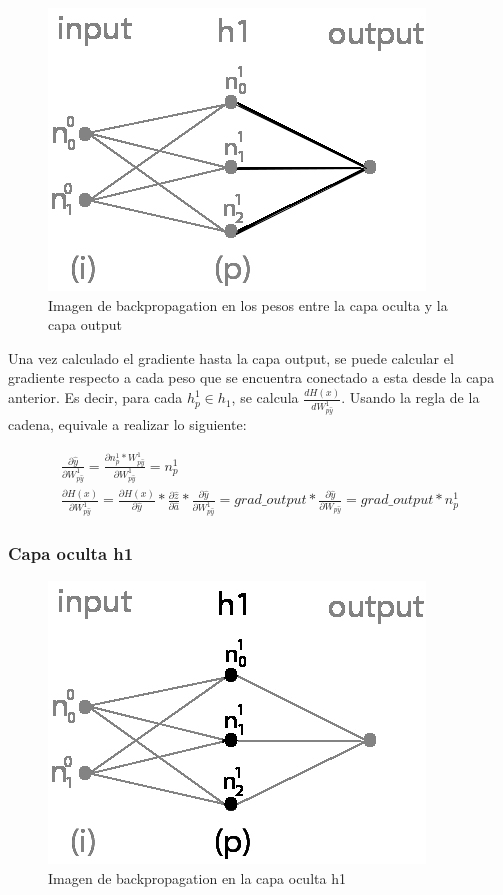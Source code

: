 \begin{figure}[H]
	\centering
	\includegraphics[scale=0.35]{imagenes/nn_1_capa_pesos_h1_output.jpg}  
	\caption{Imagen de backpropagation en los pesos entre la capa oculta y la capa output}
	\label{fig:nn_1_pesos_h1_output}
\end{figure}

Una vez calculado el gradiente hasta la capa output, se puede calcular el gradiente respecto a cada peso que se encuentra conectado a esta desde la capa anterior. Es decir, para cada $h^1_p\in h_1$, se calcula $\frac{dH(x)}{dW^1_{p\hat{y}}}$. Usando la regla de la cadena, equivale a realizar lo siguiente:

\begin{gather}
	\frac{\partial \hat{y}}{\partial W^1_{p\hat{y}}} = \frac{\partial n^1_p * W^1 _{p\hat{y} }}{\partial W^1_{p\hat{y} }} = n^1_p \\
	\frac{\partial H(x)}{\partial W^1_{p\hat{y} }} = \frac{\partial H(x)}{\partial \hat{y}} * \frac{\partial\hat{z}}{\partial \hat{a}} * \frac{\partial \hat{y}}{\partial W^1_{p\hat{y} }} =  grad\_output * \frac{\partial \hat{y}}{\partial W_{p\hat{y} }} = grad\_output * n^1_p
\end{gather}

\subsubsection{Capa oculta h1}

\begin{figure}[H]
	\centering
	\includegraphics[scale=0.35]{imagenes/nn_1_capa_h1.jpg}  
	\caption{Imagen de backpropagation en la capa oculta h1}
	\label{fig:nn_1_capa_h1}
\end{figure}

